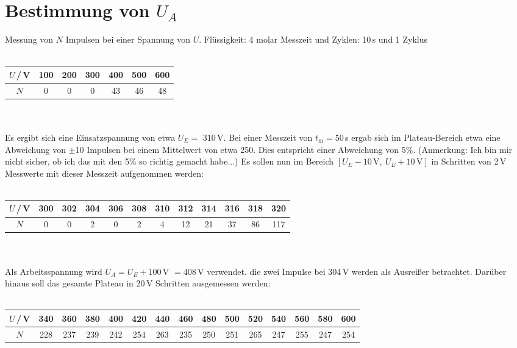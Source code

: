 \documentclass[a4paper,12pt]{article}
\begin{document}
\section{Bestimmung von $U_A$}
Messung von $N$ Impulsen bei einer Spannung von $U$.
Flüssigkeit: 4 molar\newline
Messzeit und Zyklen: 10\,s und 1 Zyklus\\ \\
\begin{tabular}{c|c|c|c|c|c|c}
$U$\,/\,V & 100 & 200 & 300 & 400 & 500 & 600
\\ \hline
$N$ & 0 & 0 & 0 & 43 & 46 & 48
\end{tabular}\\ \\
Es ergibt sich eine Einsatzspannung von etwa $U_E = $ 310\,V. Bei einer Messzeit von $t_\mathrm{m}=50$\,s ergab sich im Plateau-Bereich etwa eine Abweichung von $\pm$10 Impulsen bei einem Mittelwert von etwa 250. Dies entspricht einer Abweichung von 5\%. (Anmerkung: Ich bin mir nicht sicher, ob ich das mit den 5\% so richtig gemacht habe...)
Es sollen nun im Bereich $[U_E-10\,\mathrm{V},\ U_E+10\,\mathrm{V}]$ in Schritten von 2\,V Messwerte mit dieser Messzeit aufgenommen werden:\\ \\
\begin{tabular}{c|c|c|c|c|c|c|c|c|c|c|c}
$U$\,/\,V & 300 & 302 & 304 & 306 & 308 & 310 & 312 & 314 & 316 & 318 & 320
\\ \hline
$N$ & 0 & 0 & 2 & 0 & 2 & 4 & 12 & 21 & 37 & 86 & 117
\end{tabular}\\ \\
Als Arbeitsspannung wird $U_A=U_E+100$\,V $=408$\,V verwendet. die zwei Impulse bei 304\,V werden als Ausreißer betrachtet. Darüber hinaus soll das gesamte Plateau in 20\,V Schritten ausgemessen werden:\\ \\
\begin{tabular}{c|c|c|c|c|c|c|c|c|c|c|c|c|c|c}
$U$\,/\,V & 340 & 360 & 380 & 400 & 420 & 440 & 460 & 480 & 500 & 520 & 540 & 560 & 580 & 600
\\ \hline
$N$ & 228 & 237 & 239 & 242 & 254 & 263 & 235 & 250 & 251 & 265 & 247 & 255 & 247 & 254
\end{tabular}\\ \\
\end{document}
